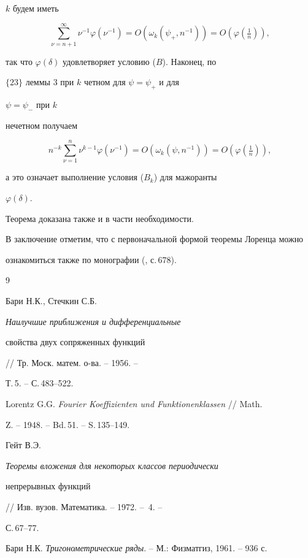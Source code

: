$k$ будем иметь


$$


\sum^\infty_{\nu=n+1}\nu^{-1}\varphi(\nu^{-1})=


O(\omega_k(\psi_+,n^{-1}))=


O\left(\varphi(\tfrac{1}{n})\right),


$$


так что $\varphi(\delta)$ удовлетворяет условию ($B$). Наконец, по


$\{23\}$ леммы 3 \cite{G3} при $k$ четном для $\psi=\psi_+$ и для


$\psi=\psi_-$ при $k$


нечетном получаем


$$


n^{-k}\sum^n_{\nu=1}\nu^{k-1}\varphi(\nu^{-1})=


O(\omega_k(\psi,n^{-1}))=O\left(\varphi(\tfrac{1}{n})\right),


$$


а это означает выполнение условия ($B_k$) для мажоранты


$\varphi(\delta)$.


Теорема доказана также и в части необходимости.





В заключение отметим, что с первоначальной формой теоремы Лоренца можно


ознакомиться также по монографии (\cite{B4}, с.\,678).





\begin{thebibliography}{9}







Бари Н.К., Стечкин С.Б. {\em Наилучшие приближения и дифференциальные


свойства двух сопряженных функций} // Тр. Моск. матем. о-ва. -- 1956. --


Т.\,5. -- С.\,483--522.




Lorentz G.G. {\em Fourier Koeffizienten und Funktionenklassen} // Math.


Z. -- 1948. -- Bd.\,51. -- S.\,135--149.




Гейт В.Э. {\em Теоремы вложения для некоторых классов периодически


непрерывных функций} // Изв. вузов. Математика. -- 1972. -- \No\,4. --


С.\,67--77.




Бари Н.К. {\em Тригонометрические ряды}. -- М.: Физматгиз, 1961. -- 936 с.








\end{thebibliography}





